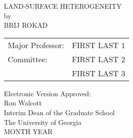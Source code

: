 \documentclass[12pt, notitlepage, twoside]{report}
\begin{document}
\newcommand{\doctitle}{Land-Surface Heterogeneity}
\newcommand{\docauthor}{Brij Rokad}



%



\newcommand{\degreesearned}{%
\singlespacing{B.Tech., Vellore Institute of Technology, INDIA, 2018\\
  }
}%

\newcommand{\degreetype}{Thesis}
\newcommand{\degreetitle}{Master}
\newcommand{\degreename}{Science}
\newcommand{\degreeyear}{2020}
\maketitlepage





\newpage
\thispagestyle{empty}
\vspace*{18pt}
\begin{center}
  \MakeUppercase{\doctitle}\\[36pt]
  by\\[36pt]
  \MakeUppercase{\docauthor}
\end{center}
\vfill

\singlespacing\begin{flushright}
  \begin{tabular}{ll}
    Major Professor: & FIRST LAST 1 \\ [24pt]
    Committee: & FIRST LAST 2 \\
    & FIRST LAST 3 \\
  \end{tabular}
\end{flushright}

\vspace*{3cm}

\begin{flushleft}
  Electronic Version Approved:\\[12pt]
  Ron Walcott\\
  Interim Dean of the Graduate School\\
  The University of Georgia\\
  MONTH YEAR
\end{flushleft}
\vspace*{1.5cm}
\end{document}

